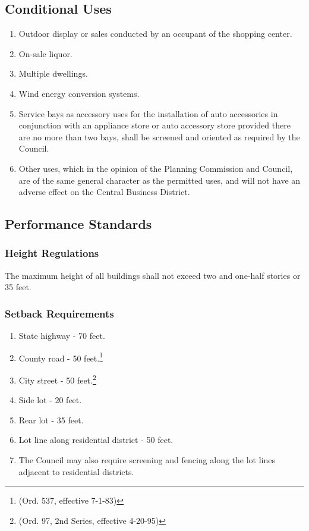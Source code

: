 \subsection{Conditional Uses}
\begin{enumerate}[{\indent}1)]
    \item Outdoor display or sales conducted by an occupant of the shopping center.
    \item On-sale liquor.  
    \item Multiple dwellings.
    \item Wind energy conversion systems.
    \item Service bays as accessory uses for the installation of auto accessories in conjunction with an appliance store or auto accessory store provided there are no more than two bays, shall be screened and oriented as required by the Council.
    \item Other uses, which in the opinion of the Planning Commission and Council, are of the same general character as the permitted uses, and will not have an adverse effect on the Central Business District.
\end{enumerate}
\subsection{Performance Standards}
\subsubsection{Height Regulations}
The maximum height of all buildings shall not exceed two and one-half stories or 35 feet.
\subsubsection{Setback Requirements}
\begin{enumerate}[{\indent}a)]
    \item State highway - 70 feet.  
    \item County road - 50 feet.\footnote{(Ord. 537, effective 7-1-83)}
    \item City street - 50 feet.\footnote{(Ord. 97, 2nd Series, effective 4-20-95)}
    \item Side lot - 20 feet.  
    \item Rear lot - 35 feet.
    \item Lot line along residential district - 50 feet.
    \item The Council may also require screening and fencing along the lot lines adjacent to residential districts.
\end{enumerate}
